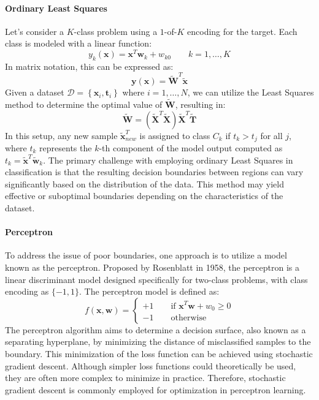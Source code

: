 \paragraph*{Ordinary Least Squares}
Let's consider a $K$-class problem using a $1$-of-$K$ encoding for the target. 
Each class is modeled with a linear function:
\[y_k(\textbf{x})=\textbf{x}^T\textbf{w}_k+w_{k0} \qquad k=1,\dots,K\]
In matrix notation, this can be expressed as:
\[\textbf{y}(\textbf{x})=\tilde{\textbf{W}}^T\tilde{\textbf{x}}\]
Given a dataset $\mathcal{D}=\left\{ \textbf{x}_i, \textbf{t}_i  \right\}$ where $i=1,\dots,N$, we can utilize the Least Squares method to determine the optimal value of $\tilde{\textbf{W}}$, resulting in:
\[\tilde{\textbf{W}}=\left(\tilde{\textbf{X}}^T\tilde{\textbf{X}}\right)\tilde{\textbf{X}}^T\tilde{\textbf{T}}\]
In this setup, any new sample $\tilde{\textbf{x}}^T_{new}$ is assigned to class $C_k$ if $t_k>t_j$ for all $j$, where $t_k$ represents the $k$-th component of the model output computed as $t_k=\tilde{\textbf{x}}^T\tilde{\textbf{w}}_k$. 
The primary challenge with employing ordinary Least Squares in classification is that the resulting decision boundaries between regions can vary significantly based on the distribution of the data. 
This method may yield effective or suboptimal boundaries depending on the characteristics of the dataset.





\paragraph*{Perceptron}
To address the issue of poor boundaries, one approach is to utilize a model known as the perceptron. 
Proposed by Rosenblatt in 1958, the perceptron is a linear discriminant model designed specifically for two-class problems, with class encoding as $\{-1,1\}$. 
The perceptron model is defined as:
\[f(\textbf{x},\textbf{w})=\begin{cases}
    +1 \qquad \text{if } \textbf{x}^T\textbf{w}+w_0 \geq 0 \\
    -1 \qquad \text{otherwise}
\end{cases}\]
The perceptron algorithm aims to determine a decision surface, also known as a separating hyperplane, by minimizing the distance of misclassified samples to the boundary. 
This minimization of the loss function can be achieved using stochastic gradient descent.
Although simpler loss functions could theoretically be used, they are often more complex to minimize in practice. 
Therefore, stochastic gradient descent is commonly employed for optimization in perceptron learning.

